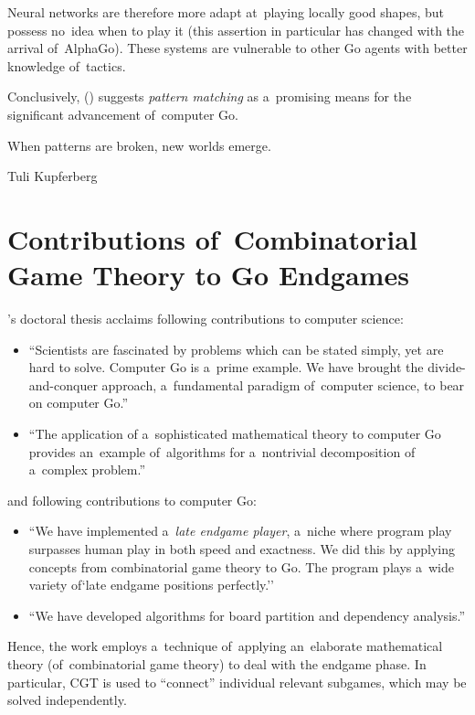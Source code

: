 Neural networks are therefore more adapt at~playing locally good shapes, but possess no~idea when to play it (this assertion in particular has changed with the arrival of~AlphaGo).
These systems are vulnerable to other Go agents with better knowledge of~tactics.

Conclusively, (\cite{Muller1995computer}) suggests \emph{pattern matching} as a~promising means for the significant advancement of~computer Go.
\epigraph{When patterns are broken, new worlds emerge.}
{Tuli Kupferberg}

\section{Contributions of~Combinatorial Game Theory to Go Endgames}
\Mueller's doctoral thesis acclaims following contributions to computer science:
\begin{itemize}
  \item ``Scientists are fascinated by problems which can be stated simply, yet are hard to solve.
    Computer Go is a~prime example.
    We have brought the divide-and-conquer approach, a~fundamental paradigm of~computer science, to bear on computer Go.''

  \item ``The application of a~sophisticated mathematical theory to computer Go provides an~example of~algorithms for a~nontrivial decomposition of a~complex problem.''
\end{itemize}
and following contributions to computer Go:
\begin{itemize}
  \item ``We have implemented a~\emph{late endgame player}, a~niche where program play surpasses human play in both speed and exactness.
    We did this by applying concepts from combinatorial game theory to Go.
    The program plays a~wide variety of`late endgame positions perfectly.''

  \item ``We have developed algorithms for board partition and dependency analysis.''
\end{itemize}
Hence, the work employs a~technique of~applying an~elaborate mathematical theory (of~combinatorial game theory) to deal with the endgame phase.
In particular, CGT is used to ``connect'' individual relevant subgames, which may be solved independently.

